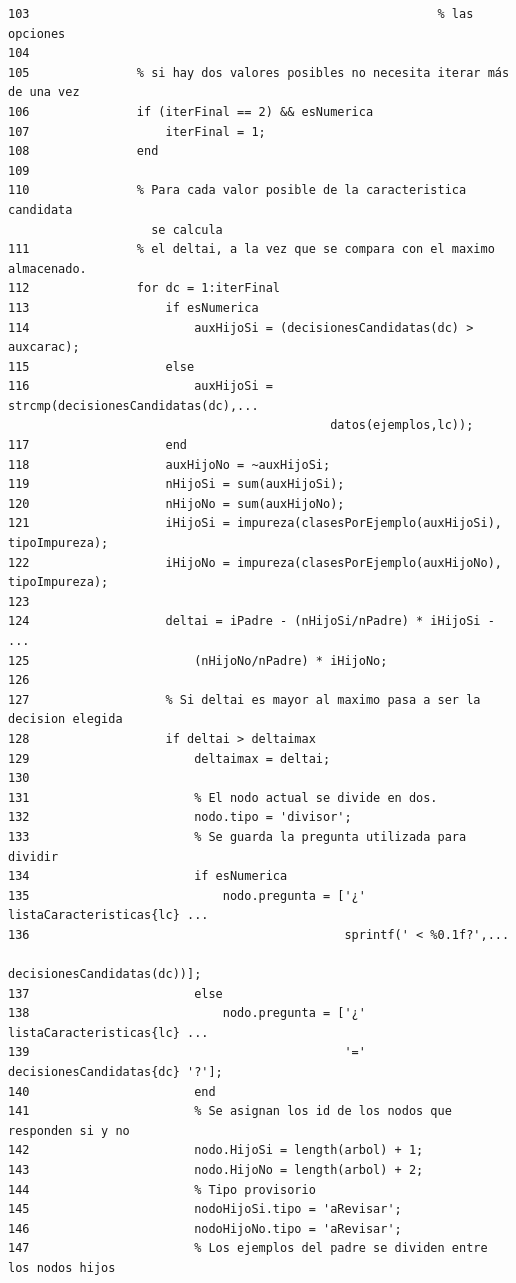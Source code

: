 \documentclass[11pt,a4paper,final]{article}
\begin{document}
\begin{verbatim}
103                                                         % las opciones
104               
105               % si hay dos valores posibles no necesita iterar más de una vez
106               if (iterFinal == 2) && esNumerica
107                   iterFinal = 1;
108               end
109               
110               % Para cada valor posible de la caracteristica candidata 
                    se calcula
111               % el deltai, a la vez que se compara con el maximo almacenado.
112               for dc = 1:iterFinal
113                   if esNumerica
114                       auxHijoSi = (decisionesCandidatas(dc) > auxcarac);
115                   else
116                       auxHijoSi = strcmp(decisionesCandidatas(dc),...
                                             datos(ejemplos,lc));
117                   end
118                   auxHijoNo = ~auxHijoSi;
119                   nHijoSi = sum(auxHijoSi);
120                   nHijoNo = sum(auxHijoNo);
121                   iHijoSi = impureza(clasesPorEjemplo(auxHijoSi), tipoImpureza);
122                   iHijoNo = impureza(clasesPorEjemplo(auxHijoNo), tipoImpureza);
123                   
124                   deltai = iPadre - (nHijoSi/nPadre) * iHijoSi - ...
125                       (nHijoNo/nPadre) * iHijoNo;
126                      
127                   % Si deltai es mayor al maximo pasa a ser la decision elegida
128                   if deltai > deltaimax
129                       deltaimax = deltai;
130                       
131                       % El nodo actual se divide en dos.
132                       nodo.tipo = 'divisor';
133                       % Se guarda la pregunta utilizada para dividir
134                       if esNumerica
135                           nodo.pregunta = ['¿' listaCaracteristicas{lc} ...
136                                            sprintf(' < %0.1f?',...
                                                       decisionesCandidatas(dc))];
137                       else
138                           nodo.pregunta = ['¿' listaCaracteristicas{lc} ...
139                                            '=' decisionesCandidatas{dc} '?'];
140                       end
141                       % Se asignan los id de los nodos que responden si y no
142                       nodo.HijoSi = length(arbol) + 1;
143                       nodo.HijoNo = length(arbol) + 2;
144                       % Tipo provisorio
145                       nodoHijoSi.tipo = 'aRevisar';
146                       nodoHijoNo.tipo = 'aRevisar';
147                       % Los ejemplos del padre se dividen entre los nodos hijos

\end{verbatim}
\end{document}

